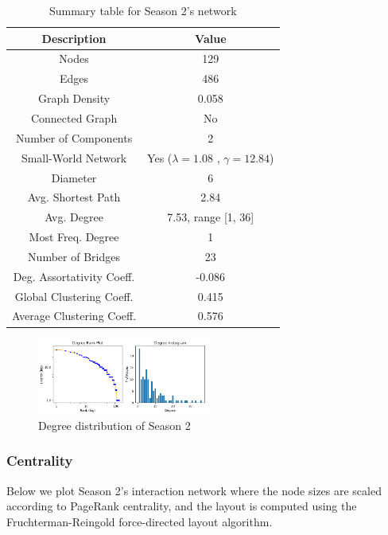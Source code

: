 \documentclass[10pt,twocolumn,letterpaper]{article}
\begin{document}
\begin{table}[!h]
    \centering
    \small
    \begin{tabular}{c|c}
        Description & Value  \\
        \hline
        Nodes & 129 \\
        Edges & 486 \\
        Graph Density & 0.058 \\
        Connected Graph & No \\
        Number of Components & 2 \\
        Small-World Network & Yes ($\lambda=1.08$ , $\gamma=12.84$) \\
        Diameter & 6 \\
        Avg. Shortest Path & 2.84 \\
        Avg. Degree & 7.53, range [1, 36] \\
        Most Freq. Degree & 1 \\
        Number of Bridges & 23 \\
        Deg. Assortativity Coeff. & -0.086\\
        Global Clustering Coeff. & 0.415 \\
        Average Clustering Coeff. & 0.576 \\
        \hline 
    \end{tabular}
    \vspace{0.2cm}
    \caption{Summary table for Season 2's network}
    \label{tab:my_label}
\end{table} 

\begin{figure}[!h]
    \centering
    \includegraphics[width=0.5\textwidth]{img/s2/degree_plot.jpg}
    \caption{\small{Degree distribution of Season 2}}
\end{figure}

\subsubsection{Centrality}

Below we plot Season 2's interaction network where the node sizes are scaled according to PageRank centrality, and the layout is computed using the Fruchterman-Reingold force-directed layout algorithm.
\end{document}
